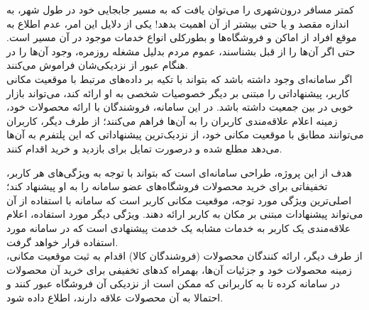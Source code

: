 
کمتر مسافر درون‌شهری را می‌توان یافت که به مسیر جابجایی خود در طول شهر، به اندازه مقصد و یا حتی بیشتر از آن اهمیت بدهد! یکی از دلایل این امر، عدم اطلاع به موقع افراد از اماکن و فروشگاه‌ها و بطورکلی انواع خدمات موجود در آن مسیر است. حتی اگر آن‌ها را از قبل بشناسند، عموم مردم بدلیل مشغله روزمره، وجود آن‌ها را در هنگام عبور از نزدیکی‌شان فراموش می‌کنند.\\

اگر سامانه‌ای وجود داشته باشد که بتواند با تکیه بر داده‌های مرتبط با موقعیت مکانی کاربر، پیشنهاداتی را مبتنی بر دیگر خصوصیات شخصی به او ارائه کند، می‌تواند بازار خوبی در بین جمعیت داشته باشد. در این سامانه، فروشندگان با ارائه محصولات خود، زمینه اعلام علاقه‌مندی کاربران را به آن‌ها فراهم می‌کنند؛ از طرف دیگر،‌ کاربران می‌توانند مطابق با موقعیت مکانی خود، از نزدیک‌ترین پیشنهاداتی که این پلتفرم به آن‌ها می‌دهد مطلع شده و درصورت تمایل برای بازدید و خرید اقدام کنند.


هدف از این پروژه، طراحی سامانه‌ای است که بتواند با توجه به ویژگی‌های هر کاربر، تخفیفاتی برای خرید محصولات فروشگاه‌های عضو سامانه را به او پیشنهاد کند؛ اصلی‌ترین ویژگی مورد توجه، موقعیت مکانی  کاربر است که سامانه‌ با استفاده از آن می‌تواند پیشنهادات مبتنی بر مکان  به کاربر ارائه دهند. ویژگی دیگر مورد استفاده، اعلام علاقه‌مندی یک کاربر به خدمات مشابه یک خدمت پیشنهادی است که در سامانه مورد استفاده قرار خواهد گرفت.\\

از طرف دیگر، ارائه کنندگان محصولات (فروشندگان کالا) اقدام به ثبت موقعیت مکانی، زمینه محصولات خود و جزئیات آن‌ها، بهمراه کدهای تخفیفی برای خرید آن محصولات در سامانه کرده تا به کاربرانی که ممکن است از نزدیکی آن فروشگاه عبور کنند و احتمالا به آن محصولات علاقه دارند، اطلاع داده شود.\\

\newpage


